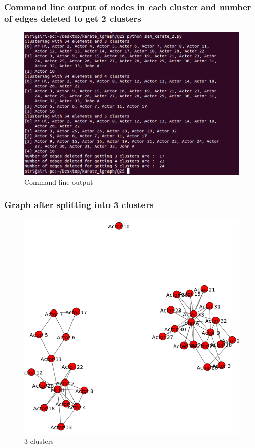 \subsubsection{Command line output of nodes in each cluster and number of edges deleted to get 2 clusters}
\begin{figure}[ht]    
    \begin{center}
        \includegraphics[scale=0.9]{cmd_2.png}
         \caption{Command line output}
        \label{c3}
    \end{center}
\end{figure}
\newpage

\subsubsection{Graph after splitting into 3 clusters}
\begin{figure}[ht]    
    \begin{center}
        \includegraphics[scale=0.7]{output2.png}
         \caption{3 clusters}
        \label{d4}
    \end{center}
\end{figure}
\newpage

